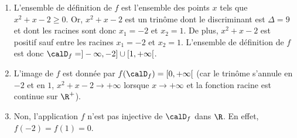 \begin{enumerate}
\item L'ensemble de définition de $f$ est l'ensemble des points $x$ tels que $x^2 + x -2 \geqslant 0$. Or, $x^2 + x -2$ est un trinôme dont le discriminant est $\Delta = 9$ et dont les racines sont donc $x_1 = -2$ et $x_2 =1$. De plus, $x^2 +x -2$ est positif sauf entre les racines $x_1 = -2$ et $x_2= 1$. L'ensemble de définition de $f$ est donc $\calD_f = ]-\infty,-2] \cup [1, +\infty[$.
\item L'image de $f$ est donnée par $f(\calD_f) = [0,+\infty[$ (car le trinôme s'annule en $-2$ et en $1$, $x^2+x-2 \to + \infty$ lorsque $x \to + \infty$ et la fonction racine est continue sur $\R^+$).
\item Non, l'application $f$ n'est pas injective de $\calD_f$ dans $\R$. En effet, $f(-2) =  f(1)= 0$.
\end{enumerate}
